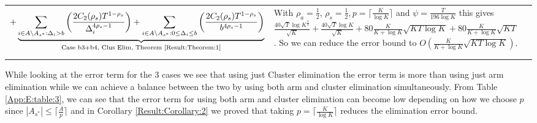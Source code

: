 \begin{table}
\begin{center}
\begin{tabular}{p{1.4cm}p{10.3cm}p{3.5cm}}
\begin{align*}
 + \underbrace{\sum_{i\in A\setminus A_{s^*}:\Delta_{i} > b}\bigg(\dfrac{2C_{2}(\rho_{s})T^{1-\rho_{s}}}{\Delta_{i}^{4\rho_{s}-1}} \bigg)+ \sum_{i\in A\setminus A_{s^*}:0\leq\Delta_{i}\leq b}\bigg(\dfrac{2C_{2}(\rho_{s})T^{1-\rho_{s}}}{b^{4\rho_{s} -1}} \bigg)}_{\text{Case b3+b4, Clus Elim, Theorem \ref{Result:Theorem:1}}} \end{align*} & With $\rho_{a}=\frac{1}{2}$, $\rho_{s}=\frac{1}{2}, p=\lceil \frac{K}{\log K}\rceil$ and $\psi=\frac{T}{196 \log K}$ this gives $\frac{40 \sqrt{T}\log K^{\frac{3}{2}} }{\sqrt{K}} + \frac{40 \sqrt{T}\log K}{\sqrt{K}} + 80 \frac{K}{K+\log K}\sqrt{KT\log K} + 80 \frac{K}{K+\log K}\sqrt{KT}$. So we can reduce the error bound to $O(\frac{K}{K+\log K}\sqrt{KT\log K})$.
\end{tabular}
\end{center}	
\end{table}
 
 While looking at the error term for the $3$ cases we see that using just Cluster elimination the error term is more than using just arm elimination while we can achieve a balance between the two by using both arm and cluster  elimination simultaneously. From Table \ref{App:E:table:3}, we can see that the error term for using both arm and cluster elimination can become low depending on how we choose $p$ since $|A_{s^{*}}|\leq \lceil\frac{A}{p}\rceil$ and in Corollary \ref{Result:Corollary:2} we proved that taking $p=\big\lceil \frac{K}{\log K} \big\rceil$ reduces the elimination error bound.
 
 
 
